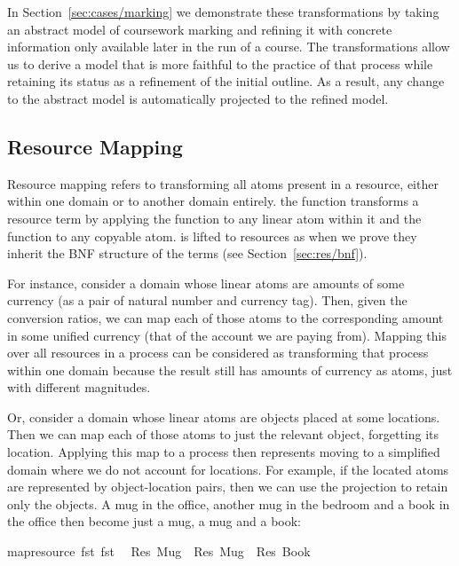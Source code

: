 \documentclass[class=smolathesis,crop=false]{standalone}
\begin{document}
In Section~\ref{sec:cases/marking} we demonstrate these transformations by taking an abstract model of coursework marking and refining it with concrete information only available later in the run of a course.
The transformations allow us to derive a model that is more faithful to the practice of that process while retaining its status as a refinement of the initial outline.
As a result, any change to the abstract model is automatically projected to the refined model.

\subsection{Resource Mapping}
\label{sec:proc/transform/res-map}

Resource mapping refers to transforming all atoms present in a resource, either within one domain or to another domain entirely.
 the function  transforms a resource term by applying the function  to any linear atom within it and the function  to any copyable atom.
 is lifted to resources as  when we prove they inherit the BNF structure of the terms (see Section~\ref{sec:res/bnf}).

For instance, consider a domain whose linear atoms are amounts of some currency (\eg as a pair of natural number and currency tag).
Then, given the conversion ratios, we can map each of those atoms to the corresponding amount in some unified currency (\eg that of the account we are paying from).
Mapping this over all resources in a process can be considered as transforming that process within one domain because the result still has amounts of currency as atoms, just with different magnitudes.

Or, consider a domain whose linear atoms are objects placed at some locations.
Then we can map each of those atoms to just the relevant object, forgetting its location.
Applying this map to a process then represents moving to a simplified domain where we do not account for locations.
For example, if the located atoms are represented by object-location pairs, then we can use the projection  to retain only the objects.
A mug in the office, another mug in the bedroom and a book in the office then become just a mug, a mug and a book:
\begin{isabelle}
\centering
  map{\isacharunderscore}resource\ fst\ fst\ \isanewline
  \isacharequal\ Res\ Mug\ \isasymodot\ Res\ Mug\ \isasymodot\ Res\ Book
\end{isabelle}
\end{document}
